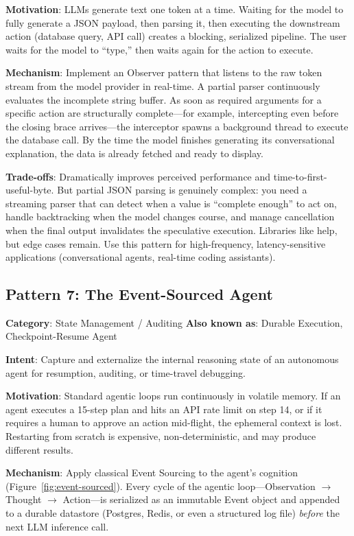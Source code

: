 \textbf{Motivation}: LLMs generate text one token at a time. Waiting for the model to fully generate a JSON payload, then parsing it, then executing the downstream action (database query, API call) creates a blocking, serialized pipeline. The user waits for the model to ``type,'' then waits again for the action to execute.

\textbf{Mechanism}: Implement an Observer pattern that listens to the raw token stream from the model provider in real-time. A partial parser continuously evaluates the incomplete string buffer. As soon as required arguments for a specific action are structurally complete---for example, intercepting  even before the closing brace arrives---the interceptor spawns a background thread to execute the database call. By the time the model finishes generating its conversational explanation, the data is already fetched and ready to display.

\textbf{Trade-offs}: Dramatically improves perceived performance and time-to-first-useful-byte. But partial JSON parsing is genuinely complex: you need a streaming parser that can detect when a value is ``complete enough'' to act on, handle backtracking when the model changes course, and manage cancellation when the final output invalidates the speculative execution. Libraries like  help, but edge cases remain. Use this pattern for high-frequency, latency-sensitive applications (conversational agents, real-time coding assistants).


\subsection{Pattern 7: The Event-Sourced Agent}

\textbf{Category}: State Management / Auditing \hfill \textbf{Also known as}: Durable Execution, Checkpoint-Resume Agent

\textbf{Intent}: Capture and externalize the internal reasoning state of an autonomous agent for resumption, auditing, or time-travel debugging.

\textbf{Motivation}: Standard agentic loops run continuously in volatile memory. If an agent executes a 15-step plan and hits an API rate limit on step 14, or if it requires a human to approve an action mid-flight, the ephemeral context is lost. Restarting from scratch is expensive, non-deterministic, and may produce different results.

\textbf{Mechanism}: Apply classical Event Sourcing to the agent's cognition (Figure~\ref{fig:event-sourced}). Every cycle of the agentic loop---Observation $\to$ Thought $\to$ Action---is serialized as an immutable Event object and appended to a durable datastore (Postgres, Redis, or even a structured log file) \emph{before} the next LLM inference call.

